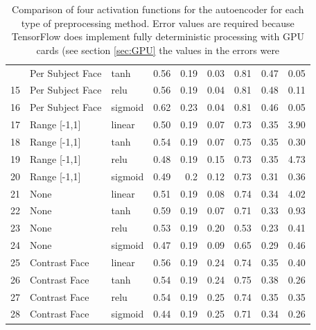 \begin{table}[!h]
{\begin{tabular}{lllrrrrrr}
             \hdashline
             14&Per Subject Face  & tanh   &    0.56 &   0.19 &     0.03 &    0.81 &   0.47 &     0.05 \\
             15&Per Subject Face  & relu   &    0.56 &   0.19 &     0.04 &    0.81 &   0.48 &     0.11 \\
             16& Per Subject Face      & sigmoid &    0.62 &   0.23 &     0.04 &    0.81 &   0.46 &     0.05 \\
             \hline
             17&Range [-1,1]      & linear &    0.50 &   0.19 &     0.07 &    0.73 &   0.35 &     3.90 \\
             18&Range [-1,1]      & tanh   &    0.54 &   0.19 &     0.07 &    0.75 &   0.35 &     0.30 \\
             19&Range [-1,1]      & relu   &    0.48 &   0.19 &     0.15 &    0.73 &   0.35 &     4.73 \\
             20& Range [-1,1]      & sigmoid &    0.49 &   0.2  &     0.12 &    0.73 &   0.31 &     0.36 \\
             \hline
             21&None              & linear &    0.51 &   0.19 &     0.08 &    0.74 &   0.34 &     4.02 \\
             22&None              & tanh   &    0.59 &   0.19 &     0.07 &    0.71 &   0.33 &     0.93 \\
             23&None              & relu   &    0.53 &   0.19 &     0.20 &    0.53 &   0.23 &     0.41 \\
             24& None       & sigmoid &    0.47 &   0.19 &     0.09 &    0.65 &   0.29 &     0.46 \\
             \hline
             25&Contrast Face     & linear &    0.56 &   0.19 &     0.24 &    0.74 &   0.35 &     0.40 \\
             26&Contrast Face     & tanh   &    0.54 &   0.19 &     0.24 &    0.75 &   0.38 &     0.26 \\
             27&Contrast Face     & relu   &    0.54 &   0.19 &     0.25 &    0.74 &   0.35 &     0.35 \\
             28& Contrast Face    & sigmoid &    0.44 &   0.19 &     0.25 &    0.71 &   0.34 &     0.26 \\
             \hline
            \end{tabular}
              \caption{Comparison of four activation functions for the autoencoder for each type of preprocessing method.
              Error values are required because TensorFlow does implement fully deterministic
              processing with GPU cards (see section \ref{sec:GPU} the values in the errors were
}}
\end{table}
